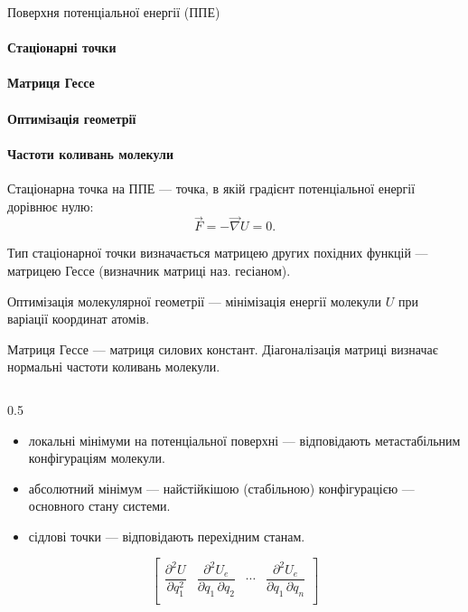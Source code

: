 \documentclass[]{beamer}
\begin{document}
\begin{frame}[t]{Поверхня потенціальної енергії (ППЕ)}\small%
	\framesubtitle<1>{Стаціонарні точки}%
	\framesubtitle<2>{Матриця Гессе}%
	\framesubtitle<3>{Оптимізація геометрії}%
	\framesubtitle<4>{Частоти коливань молекули}%
	\vspace{-1.5em}
	\begin{overprint}
		\begin{block}{}
			Стаціонарна точка на ППЕ --- точка, в якій градієнт потенціальної енергії дорівнює нулю:
			\begin{equation*}
				\vec{F} = -\vec{\nabla}U = 0.
			\end{equation*}
		\end{block}
		\begin{block}{}\justifying
			Тип стаціонарної точки визначається матрицею других похідних функцій --- матрицею Гессе (визначник матриці наз. гесіаном).
		\end{block}
		\begin{alertblock}{}
			Оптимізація молекулярної геометрії --- мінімізація енергії молекули  $U$ при варіації координат атомів.
		\end{alertblock}
		\begin{alertblock}{}
			Матриця Гессе --- матриця силових констант. Діагоналізація матриці визначає нормальні частоти коливань молекули.
		\end{alertblock}
	\end{overprint}
	\begin{columns}
		\begin{column}{0.5\linewidth}
			\begin{overprint}
				\onslide<1>
				\begin{itemize}
					\item локальні мінімуми на потенціальної поверхні --- відповідають метастабільним конфігураціям молекули.
					\item абсолютний мінімум --- найстійкішою (стабільною) конфігурацією --- основного стану системи.
					\item сідлові точки --- відповідають перехідним станам.
				\end{itemize}
				\onslide<2>
				\begin{equation*}\label{}
					\begin{bmatrix}
						\dfrac{\partial^2 U}{\partial q_1^2}               & \dfrac{\partial^2 U_e}{\partial q_1\,\partial q_2} & \cdots & \dfrac{\partial^2 U_e}{\partial q_1\,\partial q_n} \\

\end{bmatrix}
\end{equation*}
\end{overprint}
\end{column}
\end{columns}
\end{frame}
\end{document}

